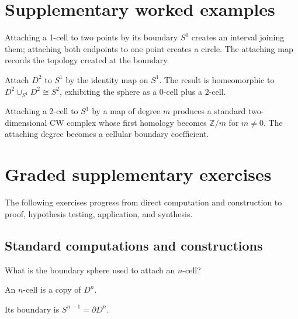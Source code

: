 \section{Supplementary worked examples}
\label{sec:viii05-pedagogy}

\begin{example}\label{ex:viii05-ped-01}
Attaching a 1-cell to two points by its boundary $S^0$ creates an interval joining them; attaching both endpoints to one point creates a circle.  The attaching map records the topology created at the boundary.
\end{example}

\begin{example}\label{ex:viii05-ped-02}
Attach $D^2$ to $S^1$ by the identity map on $S^1$.  The result is homeomorphic to $D^2\cup_{S^1}D^2\cong S^2$, exhibiting the sphere as a $0$-cell plus a $2$-cell.
\end{example}

\begin{example}\label{ex:viii05-ped-03}
Attaching a 2-cell to $S^1$ by a map of degree $m$ produces a standard two-dimensional CW complex whose first homology becomes $\mathbb Z/m$ for $m\ne0$.  The attaching degree becomes a cellular boundary coefficient.
\end{example}

\section{Graded supplementary exercises}
The following exercises progress from direct computation and construction to proof, hypothesis testing, application, and synthesis.

\subsection*{Standard computations and constructions}

\begin{exercise}\label{exr:viii05-ped-01}
What is the boundary sphere used to attach an $n$-cell?
\end{exercise}
\begin{hint}
An $n$-cell is a copy of $D^n$.
\end{hint}
\begin{solution}
Its boundary is $S^{n-1}=\partial D^n$.
\end{solution}

